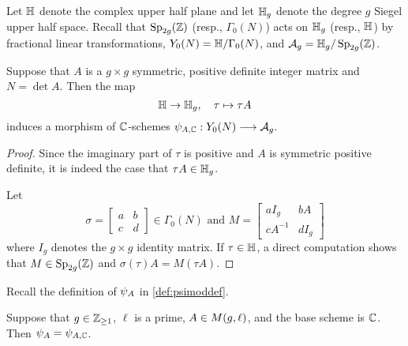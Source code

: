 \documentclass{amsart}
\begin{document}
Let $\mathbb{H}$ denote the complex upper half plane and let $\mathbb{H}_g$ denote the degree $g$ Siegel upper half space. Recall that $\operatorname{Sp}_{2g}(\mathbb{Z})$ (resp., $\Gamma_0(N)$) acts on $\mathbb{H}_g$ (resp., $\mathbb{H}$) by fractional linear transformations,
 $Y_0(N) = \mathbb{H}/\Gamma_0(N)$, and $\mathcal{A}_g = \mathbb{H}_g/\operatorname{Sp}_{2g}(\mathbb{Z})$.
\begin{lemma}\label{lem:psi-A-n}
Suppose that $A$ is a $g \times g$ symmetric, positive definite integer matrix and $N = \det A$.
Then the map \[
  \mathbb{H} \to \mathbb{H}_g, \quad  \tau \mapsto \tau A
\]
induces a morphism of $\mathbb{C}$-schemes
$
  {\psi}_{A, \mathbb{C}}: Y_0(N) \longrightarrow \mathcal{A}_g.
$
\end{lemma}

\begin{proof}
  Since the imaginary part of $\tau$ is positive and $A$ is symmetric positive definite, it is indeed the case that $\tau A \in \mathbb{H}_g$.

Let
\[
\sigma = \begin{bmatrix} a & b \\ c & d \end{bmatrix} \in \Gamma_0(N) \text{ and } M = \begin{bmatrix} aI_g & bA \\ cA^{-1} & dI_g \end{bmatrix}
\]
where $I_g$ denotes the $g \times g$ identity matrix.
If $\tau \in \mathbb{H}$, a direct computation shows that $M \in\operatorname{Sp}_{2g}(\mathbb{Z})$
and  $\sigma(\tau)A = M(\tau A)$.
\end{proof}

Recall the definition of $\psi_{A}$ in \eqref{def:psimoddef}.

\begin{proposition}\label{prop:psimod-over-c}
Suppose that $g\in\mathbb{Z}_{\ge 1}$, $\ell$ is a prime, $A \in M(g,\ell)$, and
 the base scheme is $\mathbb{C}$. Then $\psi_{A} = {\psi}_{A, \mathbb{C}}$.
\end{proposition}
\end{document}
